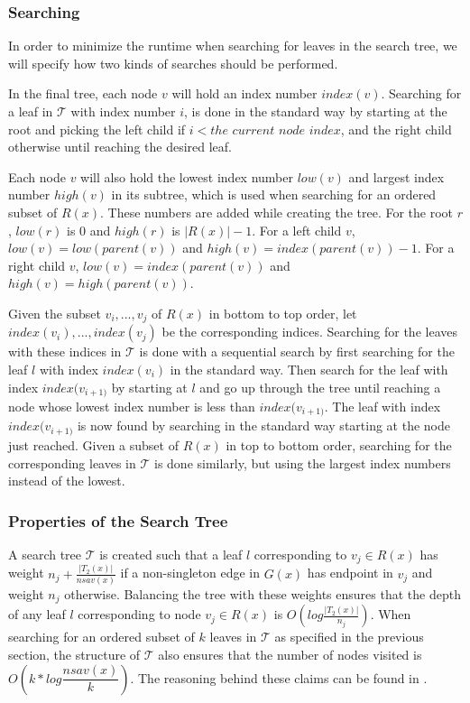 \subsubsection{Searching}
\label{st_searching}
In order to minimize the runtime when searching for leaves in the search tree, we will specify how two kinds of searches should be performed.

In the final tree, each node $v$ will hold an index number $index(v)$. Searching for a leaf in $\mathcal{T}$ with index number $i$, is done in the standard way by starting at the root and picking the left child if $i < the$ $current$ $node$ $index$, and the right child otherwise until reaching the desired leaf.

Each node $v$ will also hold the lowest index number $low(v)$ and largest index number $high(v)$ in its subtree, which is used when searching for an ordered subset of $R(x)$. These numbers are added while creating the tree. For the root $r$, $low(r)$ is 0 and $high(r)$ is $|R(x)|-1$. For a left child $v$, $low(v)=low(parent(v))$ and $high(v)=index(parent(v))-1$. For a right child $v$, $low(v)=index(parent(v))$ and $high(v)=high(parent(v))$.

Given the subset ${v_i, ..., v_j}$ of $R(x)$ in bottom to top order, let ${index(v_i), ..., index(v_j)}$ be the corresponding indices. Searching for the leaves with these indices in $\mathcal{T}$ is done with a sequential search by first searching for the leaf $l$ with index $index(v_i)$ in the standard way. Then search for the leaf with index $index(v_{i+1)}$ by starting at $l$ and go up through the tree until reaching a node whose lowest index number is less than $index(v_{i+1)}$. The leaf with index $index(v_{i+1)}$ is now found by searching in the standard way starting at the node just reached. Given a subset of $R(x)$ in top to bottom order, searching for the corresponding leaves in $\mathcal{T}$ is done similarly, but using the largest index numbers instead of the lowest.

\subsubsection{Properties of the Search Tree}
A search tree $\mathcal{T}$ is created such that a leaf $l$ corresponding to $v_j \in R(x)$ has weight $n_j + \frac{|T_2(x)|}{nsav(x)}$ if a non-singleton edge in $G(x)$ has endpoint in $v_j$ and weight $n_j$ otherwise. Balancing the tree with these weights ensures that the depth of any leaf $l$ corresponding to node $v_j \in R(x)$ is $O(log\frac{|T_2(x)|}{n_j})$. When searching for an ordered subset of $k$ leaves in $\mathcal{T}$ as specified in the previous section, the structure of $\mathcal{T}$ also ensures that the number of nodes visited is $O(k*log \dfrac{nsav(x)}{k})$. The reasoning behind these claims can be found in \cite{nlogn}.

